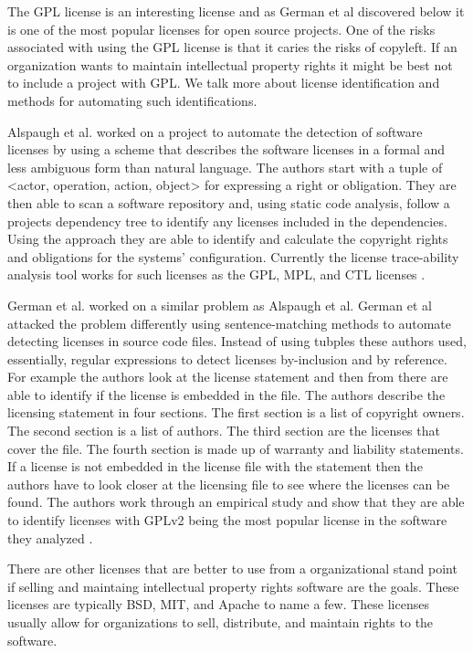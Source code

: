 \documentclass[journal]{IEEEtran}
\begin{document}
The GPL license is an interesting license and as German et al discovered below it is one of the most popular licenses for open source projects. One of the risks associated with using the GPL license is that it caries the risks of copyleft. If an organization wants to maintain intellectual property rights it might be best not to include a project with GPL. We talk more about license identification and methods for automating such identifications.


Alspaugh et al. worked  on a project to automate the detection of software licenses by using a scheme that describes the software licenses in a formal and less ambiguous form than natural language. The authors start with a tuple of <actor, operation, action, object> for expressing a right or obligation.  They are then able to scan a software repository and, using static code analysis, follow a projects dependency tree to identify any licenses included in the dependencies. Using the approach they are able to identify and calculate the copyright rights and obligations for the systems' configuration. Currently the license trace-ability analysis tool works for such licenses as the GPL, MPL, and CTL licenses {\cite{Alspaugh_Asuncion_Scacchi_2009}}.

German et al. worked on a similar problem as Alspaugh et al. German et al attacked the problem differently using sentence-matching methods to automate detecting licenses in source code files. Instead of using tubples these authors used, essentially, regular expressions to detect licenses by-inclusion and by reference. For example the authors look at the license statement and then from there are able to identify if the license is embedded in the file. The authors describe the licensing statement in four sections. The first section is a list of copyright owners. The second section is a list of authors. The third section are the licenses that cover the file. The fourth section is made up of warranty and liability statements. If a license is not embedded in the license file with the statement then the authors have to look closer at the licensing file to see where the licenses can be found. The authors work through an empirical study and show that they are able to identify licenses with GPLv2 being the most popular license in the software they analyzed \cite{German_Manabe_Inoue_2010}.

There are other licenses that are better to use from a organizational stand point if selling and maintaing intellectual property rights software are the goals. These licenses are typically BSD, MIT, and Apache to name a few. These licenses usually allow for organizations to sell, distribute, and maintain rights to the software. 
\end{document}
